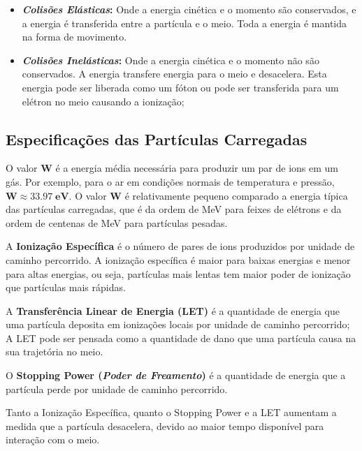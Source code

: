 \documentclass[11pt,a4paper]{article}
\newcounter{exemplo}
\begin{document}
            \begin{itemize}
                \item \textbf{\textit{\textcolor{CarnationPink}{Colisões Elásticas}}:} Onde a energia cinética e o momento são conservados, e a energia é transferida entre a partícula e o meio. Toda a energia é mantida na forma de movimento.
                
                \item \textbf{\textit{\textcolor{CarnationPink}{Colisões Inelásticas}}:} Onde a energia cinética e o momento não são conservados. A energia transfere energia para o meio e desacelera. Esta energia pode ser liberada como um fóton ou pode ser transferida para um elétron no meio causando a ionização;
            \end{itemize}

        \subsection{Especificações das Partículas Carregadas}

            O valor \textbf{\textcolor{CarnationPink}{W}} é a energia média necessária para produzir um par de ions em um gás. Por exemplo, para o ar em condições normais de temperatura e pressão, $\mathrm{\mathbf{W \approx 33.97 \; eV}}$. O valor \textbf{W} é relativamente pequeno comparado a energia típica das partículas carregadas, que é da ordem de MeV para feixes de elétrons e da ordem de centenas de MeV para partículas pesadas. 

            A \textbf{\textcolor{CarnationPink}{Ionização Específica}} é o número de pares de ions produzidos por unidade de caminho percorrido. A ionização específica é maior para baixas energias e menor para altas energias, ou seja, partículas mais lentas tem maior poder de ionização que partículas mais rápidas. 

            A \textbf{\textcolor{CarnationPink}{Transferência Linear de Energia (LET)}} é a quantidade de energia que uma partícula deposita em ionizações locais por unidade de caminho percorrido; A LET pode ser pensada como a quantidade de dano que uma partícula causa na sua trajetória no meio.

            O \textbf{\textcolor{CarnationPink}{Stopping Power (\textit{Poder de Freamento})}} é a quantidade de energia que a partícula perde por unidade de caminho percorrido. 

            Tanto a Ionização Específica, quanto o Stopping Power e a LET aumentam a medida que a partícula desacelera, devido ao maior tempo disponível para interação com o meio.
\end{document}
